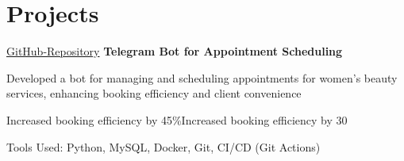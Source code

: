 \section{Projects}

\begin{twocolentry}{
		\href{https://github.com/samanyaghoobi/telebot-beauti-assistant}
		{GitHub-Repository}}
	\textbf{Telegram Bot for Appointment Scheduling}
	\begin{highlights}
		\item Developed a bot for managing and scheduling appointments for women's beauty services, enhancing booking efficiency and client convenience
		
		\item Increased booking efficiency by 45\%Increased booking efficiency by 30%
		
		\item Tools Used: Python, MySQL, Docker, Git, CI/CD (Git Actions)
	\end{highlights}
	
\end{twocolentry}
